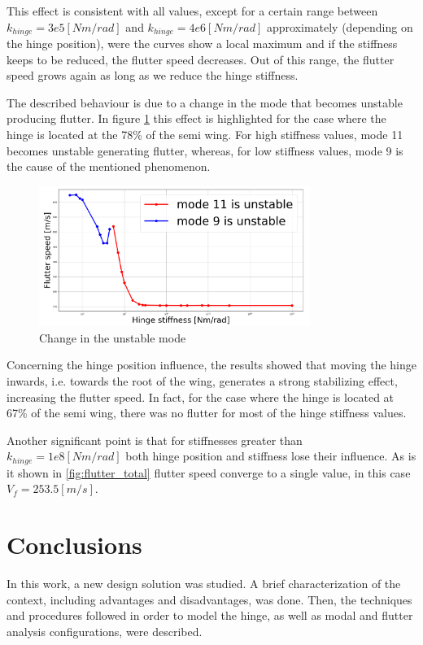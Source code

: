 \documentclass[conference]{IEEEtran}
\newlength\figureheight
\newlength\figurewidth
\begin{document}
This effect is consistent with all values, except for a certain range between $k_{hinge} = 3e5 [Nm/rad]$ and $k_{hinge} = 4e6 [Nm/rad]$ approximately (depending on the hinge position), were the curves show a local maximum and if the stiffness keeps to be reduced, the flutter speed decreases. Out of this range, the flutter speed grows again as long as we reduce the hinge stiffness.

The described behaviour is due to a change in the mode that becomes unstable producing flutter. In figure \ref{fig:changeMode} this effect is highlighted for the case where the hinge is located at the 78\% of the semi wing. For high stiffness values, mode 11 becomes unstable generating flutter, whereas, for low stiffness values, mode 9 is the cause of the mentioned phenomenon.

\begin{figure}[htp]
  \centering
  \setlength\figureheight{5cm}
  \setlength\figurewidth{6cm}
  \includegraphics[width=250pt]{images/changeMode.png}
  \caption{Change in the unstable mode}
  \label{fig:changeMode}
\end{figure}

Concerning the hinge position influence, the results showed that moving the hinge inwards, i.e. towards the root of the wing, generates a strong stabilizing effect, increasing the flutter speed. In fact, for the case where the hinge is located at 67\% of the semi wing, there was no flutter for most of the hinge stiffness values.

Another significant point is that for stiffnesses greater than $k_{hinge} = 1e8 [Nm/rad]$ both hinge position and stiffness lose their influence. As is it shown in \ref{fig:flutter_total} flutter speed converge to a single value, in this case $V_f = 253.5 [m/s]$.


\section{Conclusions}

In this work, a new design solution was studied. A brief characterization of the context, including advantages and disadvantages, was done. Then, the techniques and procedures followed in order to model the hinge, as well as modal and flutter analysis configurations, were described.
\end{document}
